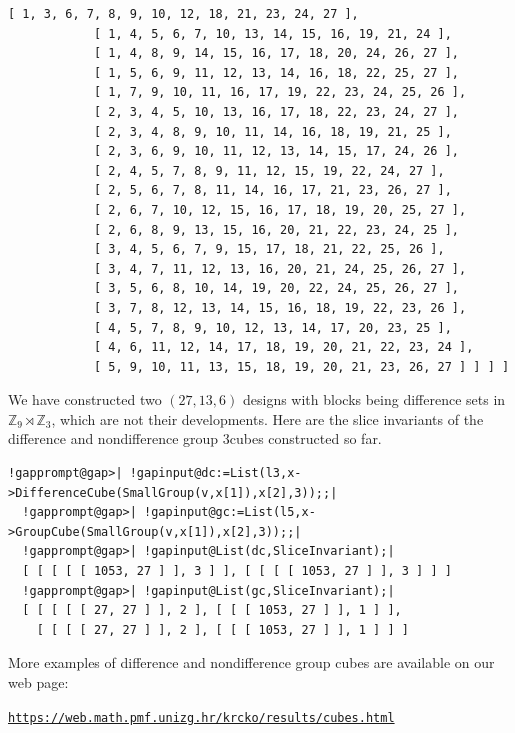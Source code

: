 \documentclass[a4paper,11pt]{report}
\begin{document}
{{\begin{Verbatim}[commandchars=!@|,fontsize=\small,frame=single,label=Example]
            [ 1, 3, 6, 7, 8, 9, 10, 12, 18, 21, 23, 24, 27 ], 
            [ 1, 4, 5, 6, 7, 10, 13, 14, 15, 16, 19, 21, 24 ], 
            [ 1, 4, 8, 9, 14, 15, 16, 17, 18, 20, 24, 26, 27 ], 
            [ 1, 5, 6, 9, 11, 12, 13, 14, 16, 18, 22, 25, 27 ], 
            [ 1, 7, 9, 10, 11, 16, 17, 19, 22, 23, 24, 25, 26 ], 
            [ 2, 3, 4, 5, 10, 13, 16, 17, 18, 22, 23, 24, 27 ], 
            [ 2, 3, 4, 8, 9, 10, 11, 14, 16, 18, 19, 21, 25 ], 
            [ 2, 3, 6, 9, 10, 11, 12, 13, 14, 15, 17, 24, 26 ], 
            [ 2, 4, 5, 7, 8, 9, 11, 12, 15, 19, 22, 24, 27 ], 
            [ 2, 5, 6, 7, 8, 11, 14, 16, 17, 21, 23, 26, 27 ], 
            [ 2, 6, 7, 10, 12, 15, 16, 17, 18, 19, 20, 25, 27 ], 
            [ 2, 6, 8, 9, 13, 15, 16, 20, 21, 22, 23, 24, 25 ], 
            [ 3, 4, 5, 6, 7, 9, 15, 17, 18, 21, 22, 25, 26 ], 
            [ 3, 4, 7, 11, 12, 13, 16, 20, 21, 24, 25, 26, 27 ], 
            [ 3, 5, 6, 8, 10, 14, 19, 20, 22, 24, 25, 26, 27 ], 
            [ 3, 7, 8, 12, 13, 14, 15, 16, 18, 19, 22, 23, 26 ], 
            [ 4, 5, 7, 8, 9, 10, 12, 13, 14, 17, 20, 23, 25 ], 
            [ 4, 6, 11, 12, 14, 17, 18, 19, 20, 21, 22, 23, 24 ], 
            [ 5, 9, 10, 11, 13, 15, 18, 19, 20, 21, 23, 26, 27 ] ] ] ]
\end{Verbatim}
 We have constructed two $(27,13,6)$ designs with blocks being difference sets in ${\ensuremath{\mathbb Z}}_9\rtimes {\ensuremath{\mathbb Z}}_3$, which are not their developments. Here are the slice invariants of the
difference and non\texttt{}difference group
3\texttt{}cubes constructed so far. 
\begin{Verbatim}[commandchars=!@|,fontsize=\small,frame=single,label=Example]
  !gapprompt@gap>| !gapinput@dc:=List(l3,x->DifferenceCube(SmallGroup(v,x[1]),x[2],3));;|
  !gapprompt@gap>| !gapinput@gc:=List(l5,x->GroupCube(SmallGroup(v,x[1]),x[2],3));;|
  !gapprompt@gap>| !gapinput@List(dc,SliceInvariant);|
  [ [ [ [ [ 1053, 27 ] ], 3 ] ], [ [ [ [ 1053, 27 ] ], 3 ] ] ]
  !gapprompt@gap>| !gapinput@List(gc,SliceInvariant);|
  [ [ [ [ [ 27, 27 ] ], 2 ], [ [ [ 1053, 27 ] ], 1 ] ], 
    [ [ [ [ 27, 27 ] ], 2 ], [ [ [ 1053, 27 ] ], 1 ] ] ]
\end{Verbatim}
 More examples of difference and non\texttt{}difference group cubes
are available on our web page: 

 \href{https://web.math.pmf.unizg.hr/~krcko/results/cubes.html} {\texttt{https://web.math.pmf.unizg.hr/\texttt{}krcko/results/cubes.html}} }

 
}
\end{document}
